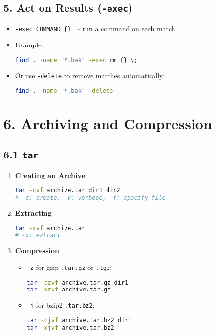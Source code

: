 \documentclass[a4paper]{report}
\begin{document}
\subsection*{5. Act on Results (\texttt{-exec})}
\begin{itemize}
    \item \texttt{-exec COMMAND \{\} \;} -- run a command on each match.
    \item Example:
\begin{lstlisting}[language=bash]
find . -name "*.bak" -exec rm {} \;
\end{lstlisting}
    \item Or use \texttt{-delete} to remove matches automatically:
\begin{lstlisting}[language=bash]
find . -name "*.bak" -delete
\end{lstlisting}
\end{itemize}

\section*{6. Archiving and Compression}
\subsection*{6.1 \texttt{tar}}
\begin{enumerate}
    \item {\textbf{Creating an Archive}}
    \begin{lstlisting}[language=bash]
tar -cvf archive.tar dir1 dir2
# -c: create, -v: verbose, -f: specify file
    \end{lstlisting}
    \item {\textbf{Extracting}}
    \begin{lstlisting}[language=bash]
tar -xvf archive.tar
# -x: extract
    \end{lstlisting}

    \item{\textbf{Compression}}
    \begin{itemize}
        \item \texttt{-z} for gzip \textrightarrow \texttt{.tar.gz} or \texttt{.tgz}:
    \begin{lstlisting}[language=bash]
tar -czvf archive.tar.gz dir1
tar -xzvf archive.tar.gz
    \end{lstlisting}
        \item \texttt{-j} for bzip2 \textrightarrow \texttt{.tar.bz2}:
    \begin{lstlisting}[language=bash]
tar -cjvf archive.tar.bz2 dir1
tar -xjvf archive.tar.bz2
    \end{lstlisting}
    \end{itemize}

\end{enumerate}
\end{document}
